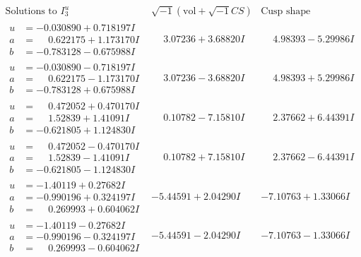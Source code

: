\documentclass[1p]{elsarticle_modified}
\theoremstyle{definition}
\newcommand{\I}{\sqrt{-1}}
\begin{document}
$$\begin{array}{c|c|c}  
\text{Solutions to }I^u_{3}& \I (\text{vol} + \sqrt{-1}CS) & \text{Cusp shape}\\
 \hline 
\begin{aligned}
u &= -0.030890 + 0.718197 I \\
a &= \phantom{-}0.622175 + 1.173170 I \\
b &= -0.783128 - 0.675988 I\end{aligned}
 & \phantom{-}3.07236 + 3.68820 I & \phantom{-}4.98393 - 5.29986 I \\ \hline\begin{aligned}
u &= -0.030890 - 0.718197 I \\
a &= \phantom{-}0.622175 - 1.173170 I \\
b &= -0.783128 + 0.675988 I\end{aligned}
 & \phantom{-}3.07236 - 3.68820 I & \phantom{-}4.98393 + 5.29986 I \\ \hline\begin{aligned}
u &= \phantom{-}0.472052 + 0.470170 I \\
a &= \phantom{-}1.52839 + 1.41091 I \\
b &= -0.621805 + 1.124830 I\end{aligned}
 & \phantom{-}0.10782 - 7.15810 I & \phantom{-}2.37662 + 6.44391 I \\ \hline\begin{aligned}
u &= \phantom{-}0.472052 - 0.470170 I \\
a &= \phantom{-}1.52839 - 1.41091 I \\
b &= -0.621805 - 1.124830 I\end{aligned}
 & \phantom{-}0.10782 + 7.15810 I & \phantom{-}2.37662 - 6.44391 I \\ \hline\begin{aligned}
u &= -1.40119 + 0.27682 I \\
a &= -0.990196 + 0.324197 I \\
b &= \phantom{-}0.269993 + 0.604062 I\end{aligned}
 & -5.44591 + 2.04290 I & -7.10763 + 1.33066 I \\ \hline\begin{aligned}
u &= -1.40119 - 0.27682 I \\
a &= -0.990196 - 0.324197 I \\
b &= \phantom{-}0.269993 - 0.604062 I\end{aligned}
 & -5.44591 - 2.04290 I & -7.10763 - 1.33066 I \\ \hline\begin{aligned}

\end{aligned}
\end{array}$$
\end{document}
